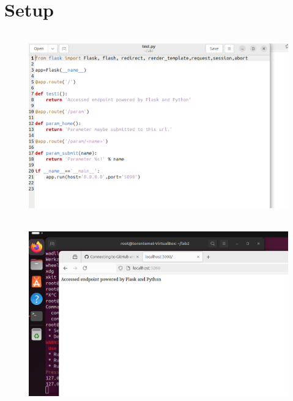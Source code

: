 \documentclass[letterpaper,11pt]{texMemo2} %
\begin{document}
	
	\maketitle %
	
	
	
	
	
	\section{Setup}
	\begin{figure}[htp]
		\centering 
		
			\includegraphics[clip,width=0.8\columnwidth,height=8cm]{9}%
		\\
		
		\includegraphics[clip,width=0.8\columnwidth,height=8cm]{10}%
		
		
		
		
		
	\end{figure}
	\newpage
\end{document}
